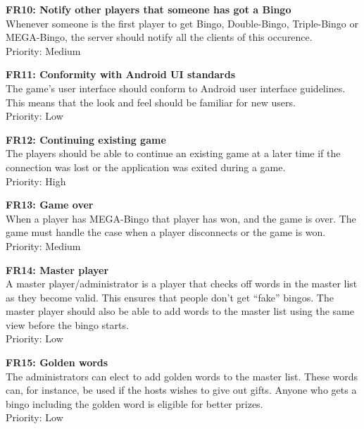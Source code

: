 {\bf FR10: Notify other players that someone has got a Bingo}\\
Whenever someone is the first player to get Bingo, Double-Bingo, Triple-Bingo
or MEGA-Bingo, the server should notify all the clients of this occurence.\\
Priority: Medium

{\bf FR11: Conformity with Android UI standards}\\
The game's user interface should conform to Android user interface guidelines.
This means that the look and feel should be familiar for new users.\\
Priority: Low

{\bf FR12: Continuing existing game}\\
The players should be able to continue an existing game at a later time if the
connection was lost or the application was exited during a game.\\
Priority: High

{\bf FR13: Game over}\\
When a player has MEGA-Bingo that player has won, and the game is over. The
game must handle the case when a player disconnects or the game is won.\\
Priority: Medium

{\bf FR14: Master player}\\
A master player/administrator is a player that checks off words in the master
list as they become valid. This ensures that people don't get ``fake'' bingos.
The master player should also be able to add words to the master list using
the same view before the bingo starts.\\
Priority: Low

{\bf FR15: Golden words}\\
The administrators can elect to add golden words to the master list. These
words can, for instance, be used if the hosts wishes to give out gifts. Anyone
who gets a bingo including the golden word is eligible for better prizes.\\
Priority: Low

